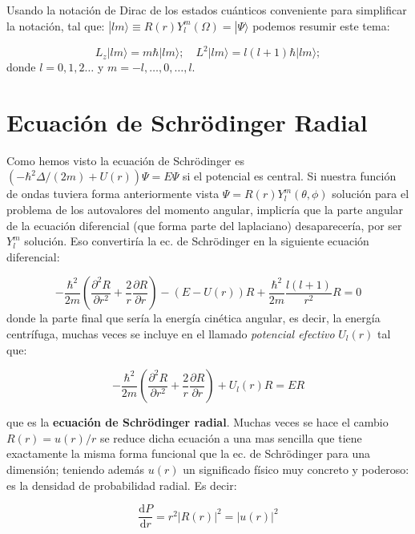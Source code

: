 \documentclass[12pt,a4paper]{article}
\numberwithin{equation}{section}
\numberwithin{figure}{section}
\newcommand{\parentesis}[1]{\left( #1  \right)}
\newcommand{\parciales}[2]{\frac{\partial #1}{\partial #2}}
\newcommand{\D}{\mathrm{d}}
\begin{document}
Usando la notación de Dirac de los estados cuánticos conveniente para simplificar la notación, tal que: $| lm \rangle \equiv R(r) Y_l^m (\Omega) = | \Psi \rangle$ podemos resumir este tema:

\begin{equation}
L_z |lm\rangle = m \hbar |lm\rangle; \quad L^2 |lm\rangle = l(l+1) \hbar |lm\rangle; 
\end{equation}
donde $l=0,1,2\ldots$ y $m=-l,\ldots,0,\ldots,l$.

\section{Ecuación de Schrödinger Radial}

Como hemos visto la ecuación de Schrödinger es $(- \hbar^2 \Delta/(2m)  + U(r)) \Psi = E \Psi$ si el potencial es central. Si nuestra función de ondas tuviera forma anteriormente vista $\Psi = R(r) Y_l^m (\theta, \phi)$ solución para el problema de los autovalores del momento angular, implicría que la parte angular de la ecuación diferencial (que forma parte del laplaciano) desaparecería, por ser $Y_l^m$ solución. Eso convertiría la ec. de Schrödinger en la siguiente ecuación diferencial:

\begin{equation}
- \dfrac{\hbar^2}{2m}  \parentesis{\parciales{^2 R}{r^2} + \dfrac{2}{r} \parciales{R}{r}} - (E-U(r)) R + \dfrac{\hbar^2}{2m} \dfrac{l(l+1)}{r^2} R = 0
\end{equation}
donde la parte final  que sería la energía cinética angular, es decir, la energía centrífuga, muchas veces se incluye en el llamado \textit{potencial efectivo} $U_l (r)$ tal que:

\begin{equation}
- \dfrac{\hbar^2}{2m} \parentesis{\parciales{^2R}{r^2} + \dfrac{2}{r} \parciales{R}{r}} + U_l (r) R = E R
\end{equation}

que es la \textbf{ecuación de Schrödinger radial}. Muchas veces se hace el cambio $R(r)=u(r)/r$ se reduce dicha ecuación a una mas sencilla que tiene exactamente la misma forma funcional que la ec. de Schrödinger para una dimensión; teniendo además $u(r)$ un significado físico muy concreto y poderoso: es la densidad de probabilidad radial. Es decir:

\begin{equation}
\dfrac{\D P}{\D r} = r^2 |R(r)|^2 = |u(r)|^2
\end{equation}
\end{document}
